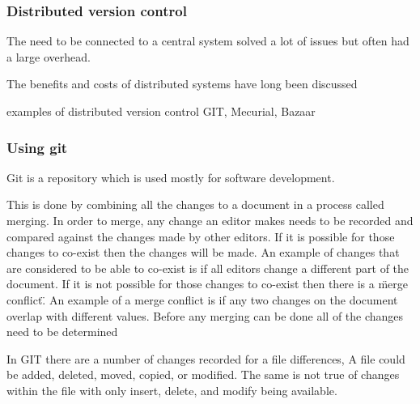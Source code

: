 \subsubsection{Distributed version control}
The need to be connected to a central system solved a lot of issues but often had a large overhead.  


The benefits and costs of distributed systems have long been discussed

examples of distributed version control
GIT, Mecurial, Bazaar


\subsubsection{Using git}
Git is a repository which is used mostly for software development.

This is done by combining all the changes to a document in a process called merging. 
In order to merge, any change an editor makes needs to be recorded and compared against the changes made by other editors.
If it is possible for those changes to co-exist then the changes will be made.
An example of changes that are considered to be able to co-exist is if all editors change a different part of the document.
If it is not possible for those changes to co-exist then there is a \"merge conflict\".
An example of a merge conflict is if any two changes on the document overlap with different values.
Before any merging can be done all of the changes need to be determined

In GIT there are a number of changes recorded for a file differences,  A file could be added, deleted, moved, copied, or modified.  The same is not true of changes within the file with only insert, delete, and modify being available.

